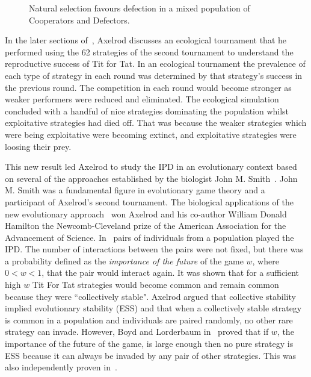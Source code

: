 \begin{figure}[!hbtp]
    \centering
    
    \caption{Natural selection favours defection in a mixed population of Cooperators
    and Defectors.}\label{fig:natural_selection_diagram}
\end{figure}

In the later sections of~\cite{Axelrod1980b}, Axelrod discusses an
ecological tournament that he performed using the 62 strategies of the second
tournament to understand the reproductive success of Tit for Tat. In an
ecological tournament the prevalence of each type of strategy in each round was
determined by that strategy's success in the previous round. The competition in
each round would become stronger as weaker performers were reduced and
eliminated. The ecological simulation concluded with a handful of nice
strategies dominating the population whilst exploitative strategies had died off.
That was because the weaker strategies which were being exploitative were becoming
extinct, and exploitative strategies were loosing their prey.

This new result led Axelrod to
study the IPD in an evolutionary context based on several of the approaches
established by the biologist John M. Smith~\cite{Smith1974,
Smith1979, Smith1973}. John M. Smith was a fundamental figure in evolutionary game theory and a
participant of Axelrod's second tournament. The biological applications of the
new evolutionary approach~\cite{Axelrod1981} won Axelrod and his co-author William
Donald Hamilton the
Newcomb-Cleveland prize of the American Association for the Advancement of
Science.
In~\cite{Axelrod1981} pairs of individuals from a
population played the IPD. The number of interactions between the pairs were
not fixed, but there was a probability defined as the \textit{importance of the future}
of the game \(w\), where \(0 < w < 1\), that the pair would interact again. It
was shown that for
a sufficient high \(w\) Tit For Tat strategies
would become common and remain common because they were ``collectively stable".
Axelrod argued that collective stability implied evolutionary stability (ESS)
and that when a collectively stable strategy is common in a population and
individuals are paired randomly, no other rare strategy can invade. However,
Boyd and Lorderbaum in~\cite{Boyd1987} proved that if \(w\), the importance of the
future of the game, is large enough then no pure strategy is ESS because it can
always be invaded by any pair of other strategies. This was also independently
proven in~\cite{Pudaite1987}.

